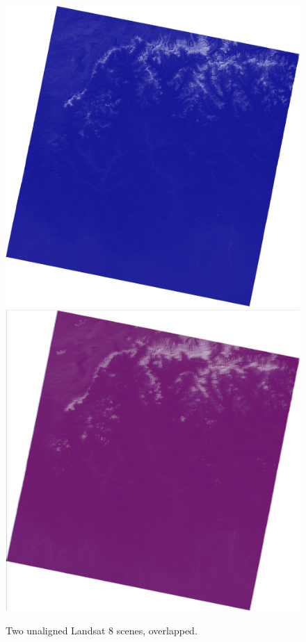 \documentclass[12pt, a4paper]{report}
\begin{document}
\begin{figure}[H]
  		\includegraphics[width=\linewidth]{blue_big_unaligned.png}
  		\endminipage\hfill
  		\includegraphics[width=\linewidth]{purple_big_unaligned.png}
  		\endminipage
  		\caption{Two unaligned Landsat 8 scenes, overlapped.}\label{fig:big_unaligned}
  	\end{figure}
  	
\end{document}
